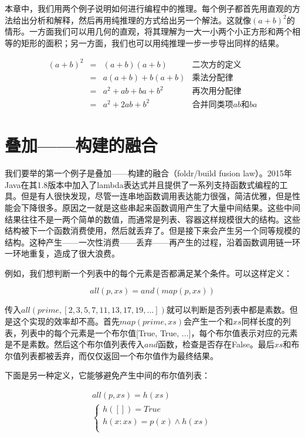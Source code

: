 \documentclass{article}
\begin{document}
本章中，我们用两个例子说明如何进行编程中的推理。每个例子都首先用直观的方法给出分析和解释，然后再用纯推理的方式给出另一个解法。这就像$(a+b)^2$的情形。一方面我们可以用几何的直观，将其理解为一大一小两个小正方形和两个相等的矩形的面积；另一方面，我们也可以用纯推理一步一步导出同样的结果。

\[
\begin{array}{rcll}
(a + b)^2 & = & (a + b)(a + b) & \text{二次方的定义} \\
          & = & a(a + b) + b(a + b) & \text{乘法分配律} \\
          & = & a^2 + ab + ba + b^2 & \text{再次用分配律} \\
          & = & a^2 + 2ab + b^2 & \text{合并同类项$ab$和$ba$}
\end{array}
\]

\section{叠加——构建的融合}

我们要举的第一个例子是叠加——构建的融合（foldr/build fusion law）。2015年Java在其1.8版本中加入了lambda表达式并且提供了一系列支持函数式编程的工具。但是有人很快发现，尽管一连串地函数调用表达能力很强，简洁优雅，但是性能会下降很多。原因之一就是这些串起来函数调用产生了大量中间结果。这些中间结果往往不是一两个简单的数值，而通常是列表、容器这样规模很大的结构。这些结构被下一个函数消费使用，然后就丢弃了。但是接下来会产生另一个同等规模的结构。这种产生——一次性消费——丢弃——再产生的过程，沿着函数调用链一环一环地重复，造成了很大浪费。

例如\cite{GLPJ-1993}，我们想判断一个列表中的每个元素是否都满足某个条件。可以这样定义：

\[
all(p, xs) = and(map(p, xs))
\]

传入$all(prime, [2, 3, 5, 7, 11, 13, 17, 19, ...])$就可以判断是否列表中都是素数。但是这个实现的效率却不高。首先$map(prime, xs)$会产生一个和$xs$同样长度的列表，列表中的每个元素是一个布尔值[True, True, ...]，每个布尔值表示对应的元素是不是素数。然后这个布尔值列表传入$and$函数，检查是否存在False。最后$xs$和布尔值列表都被丢弃，而仅仅返回一个布尔值作为最终结果。

下面是另一种定义，它能够避免产生中间的布尔值列表：

\[
\begin{array}{l}
all(p, xs) = h(xs) \\
  \begin{cases}
  h([]) = True \\
  h(x:xs) = p(x) \land h(xs) \\
  \end{cases}
\end{array}
\]
\end{document}
